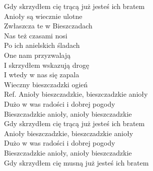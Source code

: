  Gdy skrzydłem cię trącą już jesteś ich bratem \\
\newpage
Anioły są wiecznie ulotne \\
Zwłaszcza te w Bieszczadach \\
Nas też czasami nosi \\
Po ich anielskich śladach \\
One nam przyzwalają \\
I skrzydłem wskazują drogę \\
I wtedy w nas się zapala \\
Wieczny bieszczadzki ogień \\
\hops
Ref. Anioły bieszczadzkie, bieszczadzkie anioły \\
 Dużo w was radości i dobrej pogody \\
 Bieszczadzkie anioły, anioły bieszczadzkie \\
 Gdy skrzydłem cię trącą już jesteś ich bratem \\
\hops
{} Anioły bieszczadzkie, bieszczadzkie anioły \\
 Dużo w was radości i dobrej pogody \\
 Bieszczadzkie anioły, anioły bieszczadzkie \\
 Gdy skrzydłem cię musną już jesteś ich bratem